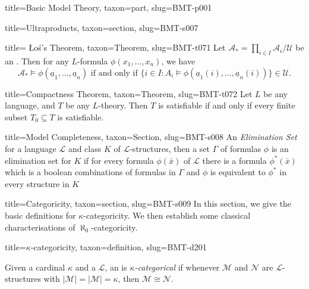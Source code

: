 \documentclass[a4paper]{article}
\begin{document}
\begin{tree}{title={Basic Model Theory}, taxon={part}, slug={BMT-p001}}
\begin{tree}{title={Ultraproducts}, taxon={section}, slug={BMT-s007}}
\begin{tree}{title={ Łoś's Theorem}, taxon={Theorem}, slug={BMT-t071}}
Let \(\mathcal {A}_* =  \prod \limits _{i \in  I}  \mathcal {A}_i /  \mathcal {U}\) be an . Then for any \(L\)-formula \(\phi (x_1, \dots ,x_n)\), we have \[\mathcal {A}_* \models   \phi ( \underline {a}_1, \dots , \underline {a}_n)  \text { if and only if }  \{ i \in  I: A_i \models \phi ( \underline {a}_1(i), \dots ,  \underline {a}_n(i)) \} \in \mathcal {U}.\]
\end{tree}

\begin{tree}{title={Compactness Theorem}, taxon={Theorem}, slug={BMT-t072}}
Let \(L\) be any language, and \(T\) be any \(L\)-theory. Then \(T\) is satisfiable if and only if every finite subset \(T_0 \subseteq  T\) is satisfiable.
\end{tree}

\end{tree}


  
  
\begin{tree}{title={Model Completeness}, taxon={Section}, slug={BMT-s008}}
An \emph{Elimination Set} for a language \(\mathcal {L}\) and class \(K\) of \(\mathcal {L}\)-structures, then a set \(\Gamma\) of formulas \(\phi\) is an elimination set for \(K\) if for every formula \(\phi ( \bar {x})\) of \(\mathcal {L}\) there is a formula \(\phi ^*( \bar {x})\) which is a boolean combinations of formulas in \(\Gamma\) and \(\phi\) is equivalent to \(\phi ^*\) in every structure in \(K\)
\end{tree}


  
  
\begin{tree}{title={Categoricity}, taxon={section}, slug={BMT-s009}}
In this section, we give the basic definitions for \(\kappa\)-categoricity. We then establish some classical characterisations of \(\aleph _0\)-categoricity.
\begin{tree}{title={\(\kappa\)-categoricity}, taxon={definition}, slug={BMT-d201}}

    Given a cardinal \(\kappa\) and a  \(\mathcal {L}\), an  is \emph{\(\kappa\)-categorical} if whenever \(\mathcal {M}\) and \(\mathcal {N}\) are \(\mathcal {L}\)-structures with \(| \mathcal {M}|=| \mathcal {M}|= \kappa\), then \(\mathcal {M}  \cong   \mathcal {N}\). 

\end{tree}


\end{tree}
\end{tree}
\end{document}
